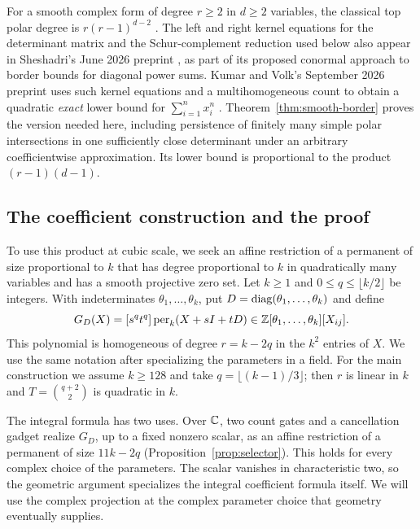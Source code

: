 For a smooth complex form of degree $r\ge2$ in $d\ge2$ variables, the classical
top polar degree is $r(r-1)^{d-2}$
\cite[Corollary~3.7]{Piene1978}.
The left and right kernel equations for the determinant matrix and the
Schur-complement reduction used below also appear in Sheshadri's June 2026
preprint \cite[Theorem~3 and Section~3.1]{SheshadriBorder2026}, as part of
its proposed conormal approach to border bounds for diagonal power sums.
Kumar and Volk's September 2026 preprint uses such kernel equations and a
multihomogeneous count to obtain a quadratic \emph{exact} lower bound for
$\sum_{i=1}^n x_i^n$
\cite[Theorem~1.1 and Section~3]{KumarVolk2026}.
Theorem~\ref{thm:smooth-border} proves the version needed here, including
persistence of finitely many simple polar intersections in one sufficiently
close determinant under an arbitrary coefficientwise approximation. Its
lower bound is proportional to the product $(r-1)(d-1)$.

\subsection{The coefficient construction and the proof}

To use this product at cubic scale, we seek an affine restriction of a
permanent of size proportional to $k$ that has degree proportional to $k$
in quadratically many variables and has a smooth projective zero set.
Let $k\ge1$ and $0\le q\le\lfloor k/2\rfloor$ be integers. With
indeterminates $\theta_1,\ldots,\theta_k$, put
$D=\operatorname{diag}(\theta_1,\ldots,\theta_k)$ and define
\[
 G_D(X)=[s^qt^q]\operatorname{per}_k(X+sI+tD)
 \in\mathbb Z[\theta_1,\ldots,\theta_k][X_{ij}].
\]
This polynomial is homogeneous of degree $r=k-2q$ in the $k^2$ entries
of $X$. We use the same notation after specializing the parameters in a
field. For the main construction we assume $k\ge128$ and take
$q=\lfloor(k-1)/3\rfloor$; then $r$ is linear in $k$ and
$T=\binom{q+2}{2}$ is quadratic in $k$.

The integral formula has two uses. Over $\mathbb C$, two count gates and a
cancellation gadget realize $G_D$, up to a fixed nonzero scalar, as an
affine restriction of a permanent of size $11k-2q$
(Proposition~\ref{prop:selector}). This holds for every complex choice of
the parameters. The scalar vanishes in characteristic two, so the geometric
argument specializes the integral coefficient formula itself. We will use
the complex projection at the complex parameter choice that geometry
eventually supplies.

